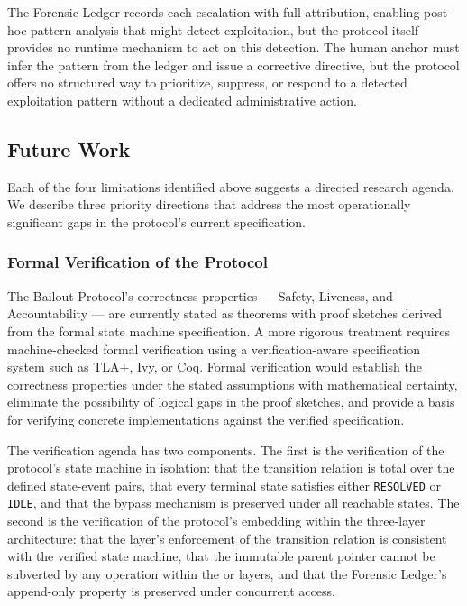 The Forensic Ledger records each escalation with full attribution, enabling post-hoc pattern analysis that might detect exploitation, but the protocol itself provides no runtime mechanism to act on this detection. The human anchor must infer the pattern from the ledger and issue a corrective directive, but the protocol offers no structured way to prioritize, suppress, or respond to a detected exploitation pattern without a dedicated administrative action.

\subsection{Future Work}

Each of the four limitations identified above suggests a directed research agenda. We describe three priority directions that address the most operationally significant gaps in the protocol's current specification.

\subsubsection{Formal Verification of the Protocol}

The Bailout Protocol's correctness properties --- Safety, Liveness, and Accountability --- are currently stated as theorems with proof sketches derived from the formal state machine specification. A more rigorous treatment requires machine-checked formal verification using a verification-aware specification system such as TLA+\cite{lamport2019tla}, Ivy\cite{ivy}, or Coq\cite{coq}. Formal verification would establish the correctness properties under the stated assumptions with mathematical certainty, eliminate the possibility of logical gaps in the proof sketches, and provide a basis for verifying concrete implementations against the verified specification.

The verification agenda has two components. The first is the verification of the protocol's state machine in isolation: that the transition relation is total over the defined state-event pairs, that every terminal state satisfies either \texttt{RESOLVED} or \texttt{IDLE}, and that the bypass mechanism is preserved under all reachable states. The second is the verification of the protocol's embedding within the \bxthree{} three-layer architecture: that the \fact{} layer's enforcement of the transition relation is consistent with the verified state machine, that the immutable parent pointer cannot be subverted by any operation within the \bounds{} or \purpose{} layers, and that the Forensic Ledger's append-only property is preserved under concurrent access.

